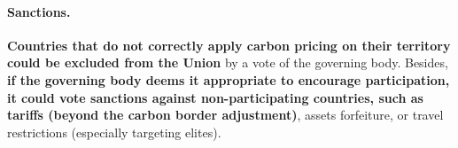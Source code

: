 \documentclass[12pt,english]{article}
\begin{document}

\paragraph{Sanctions.}

\textbf{Countries that do not correctly apply carbon pricing on their territory could be excluded from the Union} by a vote of the governing body. 
Besides, \textbf{if the governing body deems it appropriate to encourage participation, it could vote sanctions against non-participating countries, such as tariffs (beyond the carbon border adjustment)}, assets forfeiture, or travel restrictions (especially targeting elites). 
\end{document}
